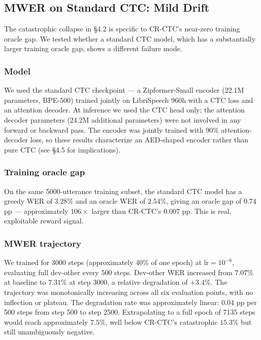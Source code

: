 \subsection{MWER on Standard CTC: Mild Drift}

The catastrophic collapse in §4.2 is specific to CR-CTC's near-zero training oracle gap. We tested whether a standard CTC model, which has a substantially larger training oracle gap, shows a different failure mode.

\subsubsection{Model}

We used the standard CTC checkpoint \cite{li2022k2} — a Zipformer-Small encoder (22.1M parameters, BPE-500) trained jointly on LibriSpeech 960h with a CTC loss and an attention decoder. At inference we used the CTC head only; the attention decoder parameters (24.2M additional parameters) were not involved in any forward or backward pass. The encoder was jointly trained with 90\% attention-decoder loss, so these results characterize an AED-shaped encoder rather than pure CTC (see §4.5 for implications).

\subsubsection{Training oracle gap}

On the same 5000-utterance training subset, the standard CTC model has a greedy WER of $3.28\%$ and an oracle WER of $2.54\%$, giving an oracle gap of $0.74$ pp — approximately $106\times$ larger than CR-CTC's $0.007$ pp. This is real, exploitable reward signal.

\subsubsection{MWER trajectory}

We trained for 3000 steps (approximately 40\% of one epoch) at lr$=10^{-6}$, evaluating full dev-other every 500 steps. Dev-other WER increased from $7.07\%$ at baseline to $7.31\%$ at step 3000, a relative degradation of $+3.4\%$. The trajectory was monotonically increasing across all six evaluation points, with no inflection or plateau. The degradation rate was approximately linear: $0.04$ pp per 500 steps from step 500 to step 2500. Extrapolating to a full epoch of 7135 steps would reach approximately $7.5\%$, well below CR-CTC's catastrophic $15.3\%$ but still unambiguously negative.

